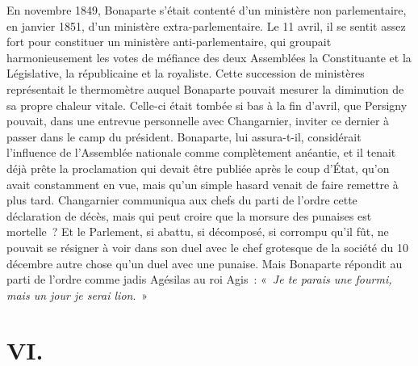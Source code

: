 \documentclass[french,twoside]{book} %
\newcommand\chapteropen{} %
\newcommand\chapterclose{} %
\begin{document}
En novembre 1849, Bonaparte s’était contenté d’un ministère non parlementaire, en janvier 1851, d’un ministère extra-parlementaire. Le 11 avril, il se sentit assez fort pour constituer un ministère anti-parlementaire, qui groupait harmonieusement les votes de méfiance des deux Assemblées la Constituante et la Législative, la républicaine et la royaliste. Cette succession de ministères représentait le thermomètre auquel Bonaparte pouvait mesurer la diminution de sa propre chaleur vitale. Celle-ci était tombée si bas à la fin d’avril, que Persigny pouvait, dans une entrevue personnelle avec Changarnier, inviter ce dernier à passer dans le camp du président. Bonaparte, lui assura-t-il, considérait l’influence de l’Assemblée nationale comme complètement anéantie, et il tenait déjà prête la proclamation qui devait être publiée après le coup d’État, qu’on avait constamment en vue, mais qu’un simple hasard venait de faire remettre à plus tard. Changarnier communiqua aux chefs du parti de l’ordre cette déclaration de décès, mais qui peut croire que la morsure des punaises est mortelle ? Et le Parlement, si abattu, si décomposé, si corrompu qu’il fût, ne pouvait se résigner à voir dans son duel avec le chef grotesque de la société du 10 décembre autre chose qu’un duel avec une punaise. Mais Bonaparte répondit au parti de l’ordre comme jadis Agésilas au roi Agis : « \emph{Je te parais une fourmi, mais un jour je serai lion}. »
\chapterclose


\chapteropen
\chapter[{VI.}]{VI.}\renewcommand{\leftmark}{VI.}
\end{document}
